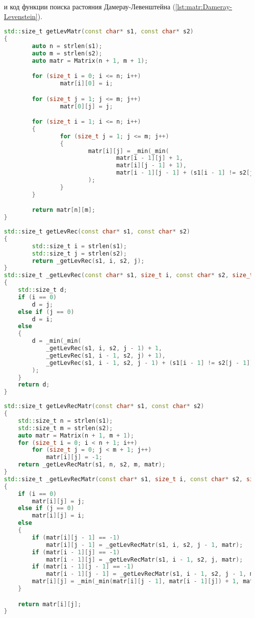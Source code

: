         и код функции поиска растояния Дамерау-Левенштейна (\ref{lst:matr:Dameray-Levenstein}).

        \begin{lstlisting}[language=C++, label=lst:matr:Levenstein, caption=Функция нерекурсивного поиска с заполнением матрицы]
std::size_t getLevMatr(const char* s1, const char* s2)
{
        auto n = strlen(s1);
        auto m = strlen(s2);
        auto matr = Matrix(n + 1, m + 1);

        for (size_t i = 0; i <= n; i++)
                matr[i][0] = i;

        for (size_t j = 1; j <= m; j++)
                matr[0][j] = j;

        for (size_t i = 1; i <= n; i++)
        {
                for (size_t j = 1; j <= m; j++)
                {
                        matr[i][j] = _min(_min(
                                matr[i - 1][j] + 1,
                                matr[i][j - 1] + 1),
                                matr[i - 1][j - 1] + (s1[i - 1] != s2[j - 1])
                        );
                }
        }

        return matr[n][m];
}
        \end{lstlisting}

        \begin{lstlisting}[language=C++, label=lst:rec:Levenstein, caption=Функция рекурсивного поиска без заполнения матрицы]
std::size_t getLevRec(const char* s1, const char* s2)
{
        std::size_t i = strlen(s1);
        std::size_t j = strlen(s2);
        return _getLevRec(s1, i, s2, j);
}
std::size_t _getLevRec(const char* s1, size_t i, const char* s2, size_t j)
{
	std::size_t d;
	if (i == 0)
		d = j;
	else if (j == 0)
		d = i;
	else
	{
		d = _min(_min(
			_getLevRec(s1, i, s2, j - 1) + 1,
			_getLevRec(s1, i - 1, s2, j) + 1),
			_getLevRec(s1, i - 1, s2, j - 1) + (s1[i - 1] != s2[j - 1])
		);
	}
	return d;
}
        \end{lstlisting}

        \begin{lstlisting}[language=C++, label=lst:rec-matr:Levenstein, caption=Функция рекурсивного поиска с заполнением матрицы]
std::size_t getLevRecMatr(const char* s1, const char* s2)
{
    std::size_t n = strlen(s1);
    std::size_t m = strlen(s2);
    auto matr = Matrix(n + 1, m + 1);
    for (size_t i = 0; i < n + 1; i++)
        for (size_t j = 0; j < m + 1; j++)
            matr[i][j] = -1;
    return _getLevRecMatr(s1, n, s2, m, matr);
}
std::size_t _getLevRecMatr(const char* s1, size_t i, const char* s2, size_t j, Matrix& matr)
{
	if (i == 0)
		matr[i][j] = j;
	else if (j == 0)
		matr[i][j] = i;
	else
	{
		if (matr[i][j - 1] == -1)
			matr[i][j - 1] = _getLevRecMatr(s1, i, s2, j - 1, matr);
		if (matr[i - 1][j] == -1)
			matr[i - 1][j] = _getLevRecMatr(s1, i - 1, s2, j, matr);
		if (matr[i - 1][j - 1] == -1)
			matr[i - 1][j - 1] = _getLevRecMatr(s1, i - 1, s2, j - 1, matr);
		matr[i][j] = _min(_min(matr[i][j - 1], matr[i - 1][j]) + 1, matr[i - 1][j - 1] + (s1[i - 1] != s2[j - 1]));
	}

	return matr[i][j];
}
        \end{lstlisting}

